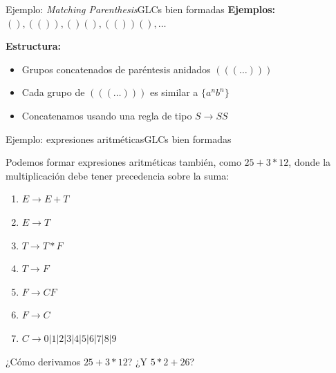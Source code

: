 \documentclass[spanish, handout]{beamer}
\begin{document}
\begin{frame}{Ejemplo: \textit{Matching Parenthesis}}{GLCs bien formadas}
        \textbf{Ejemplos:} $(), (()), ()(), (())(), \dots$ \pause
        
        \bigskip

        \textbf{Estructura:}
        \begin{itemize}
            \item Grupos concatenados de paréntesis anidados $(((\dots)))$ \pause
            \item Cada grupo de $(((\dots)))$ es similar a $\{a^n b^n\}$ \pause
            \item<7-> Concatenamos usando una regla de tipo $S \to SS$
        \end{itemize}

        \bigskip



\end{frame}

\begin{frame}{Ejemplo: expresiones aritméticas}{GLCs bien formadas}

    Podemos formar expresiones aritméticas también, como $25+3*12$, donde la multiplicación debe tener precedencia sobre la suma: \pause

    \begin{enumerate}
        \item $E \to E + T$ \pause
        \item $E \to T$ \pause
        \item $T \to T * F$ \pause
        \item $T \to F$ \pause
        \item $F \to CF$ \pause
        \item $F \to C$ \pause
        \item $C \to 0|1|2|3|4|5|6|7|8|9$
    \end{enumerate}

    \pause

    ¿Cómo derivamos $25 + 3 * 12$? \pause ¿Y $5 * 2 + 26$?
    
\end{frame}
\end{document}
